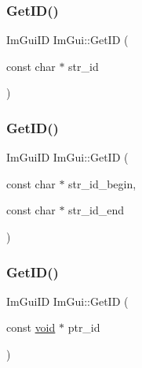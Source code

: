 \mbox{\label{namespaceImGui_a3329b04bd4235e90ad9deb00ffb38ae4}} 
\subsubsection{\texorpdfstring{Get\+I\+D()}{GetID()}\hspace{0.1cm}{\footnotesize\ttfamily [1/3]}}
{\footnotesize\ttfamily Im\+Gui\+ID Im\+Gui\+::\+Get\+ID (\begin{DoxyParamCaption}\item[{const char $\ast$}]{str\+\_\+id }\end{DoxyParamCaption})}

\mbox{\label{namespaceImGui_a26064d74efebef3aa86e1a78b3e4c333}} 
\subsubsection{\texorpdfstring{Get\+I\+D()}{GetID()}\hspace{0.1cm}{\footnotesize\ttfamily [2/3]}}
{\footnotesize\ttfamily Im\+Gui\+ID Im\+Gui\+::\+Get\+ID (\begin{DoxyParamCaption}\item[{const char $\ast$}]{str\+\_\+id\+\_\+begin,  }\item[{const char $\ast$}]{str\+\_\+id\+\_\+end }\end{DoxyParamCaption})}

\mbox{\label{namespaceImGui_a220123ad62c2180ded92b2ef91f27c5a}} 
\subsubsection{\texorpdfstring{Get\+I\+D()}{GetID()}\hspace{0.1cm}{\footnotesize\ttfamily [3/3]}}
{\footnotesize\ttfamily Im\+Gui\+ID Im\+Gui\+::\+Get\+ID (\begin{DoxyParamCaption}\item[{const \hyperlink{imgui__impl__opengl3__loader_8h_ac668e7cffd9e2e9cfee428b9b2f34fa7}{void} $\ast$}]{ptr\+\_\+id }\end{DoxyParamCaption})}


